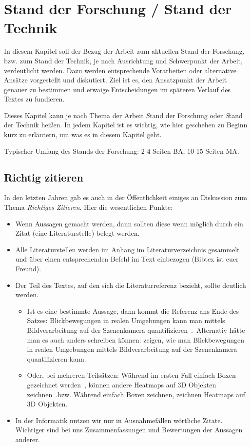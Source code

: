 \chapter{Stand der Forschung / Stand der Technik}

In diesem Kapitel soll der Bezug der Arbeit zum aktuellen Stand der Forschung, bzw. zum Stand der Technik, je nach Ausrichtung und Schwerpunkt der Arbeit, verdeutlicht werden. Dazu werden entsprechende Vorarbeiten oder alternative Ansätze vorgestellt und diskutiert. Ziel ist es, den Ansatzpunkt der Arbeit genauer zu bestimmen und etwaige Entscheidungen im späteren Verlauf des Textes zu fundieren.

Dieses Kapitel kann je nach Thema der Arbeit {\emph Stand der Forschung} oder
{\emph Stand der Technik} heißen. In jedem Kapitel ist es wichtig, wie hier
geschehen zu Beginn kurz zu erläutern, um was es in diesem Kapitel geht.

Typischer Umfang des Stands der Forschung: 2-4 Seiten BA, 10-15 Seiten MA.

\section{Richtig zitieren}

In den letzten Jahren gab es auch in der Öffentlichkeit einiges an Diskussion zum Thema {\em Richtiges Zitieren}. Hier die wesentlichen Punkte:

\begin{itemize}
     \item Wenn Aussagen gemacht werden, dann sollten diese wenn möglich durch ein Zitat (eine Literaturstelle) belegt werden.
     \item Alle Literaturstellen werden im Anhang im Literaturverzeichnis gesammelt und über einen entsprechenden Befehl im Text einbezogen (Bibtex ist euer Freund).
     \item Der Teil des Textes, auf den sich die Literaturreferenz bezieht, sollte deutlich werden. 
 
    \begin{itemize}
        \item Ist es eine bestimmte Aussage, dann kommt die Referenz ans Ende des Satzes: \glqq Blickbewegungen in realen Umgebungen kann man mittels Bildverarbeitung auf der Szenenkamera quantifizieren~\citep{3}.\grqq\ Alternativ hätte man es auch anders schreiben können: \glqq \citet{3} zeigen, wie man Blickbewegungen in realen Umgebungen mittels Bildverarbeitung auf der Szenenkamera quantifizieren kann.\grqq 
        \item Oder, bei mehreren Teilsätzen: \glqq Während im ersten Fall einfach Boxen gezeichnet werden~\citep{3}, können andere Heatmaps auf 3D Objekten zeichnen~\citep{4}.\grqq bzw. \glqq Während \citet{3}  einfach Boxen zeichnen, zeichnen \citet{4} Heatmaps auf 3D Objekten.\grqq
    \end{itemize}
 
    \item In der Informatik nutzen wir nur in Ausnahmefällen wörtliche Zitate. Wichtiger sind bei uns Zusammenfassungen und Bewertungen der Aussagen anderer.
\end{itemize}


